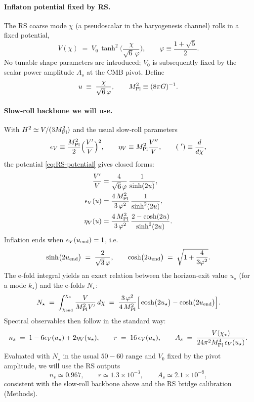 \documentclass[11pt]{article}
\begin{document}
\paragraph{Inflaton potential fixed by RS.}
The RS coarse mode \(\chi\) (a pseudoscalar in the baryogenesis channel) rolls in a fixed potential,
\begin{equation}
  V(\chi) \;=\; V_0\, \tanh^2\!\Big(\frac{\chi}{\sqrt{6}\,\varphi}\Big),
  \qquad
  \varphi \equiv \frac{1+\sqrt{5}}{2}.
  \label{eq:RS-potential}
\end{equation}
No tunable shape parameters are introduced; \(V_0\) is subsequently fixed by the scalar power amplitude \(A_s\) at the CMB pivot. Define
\[
  u \;\equiv\; \frac{\chi}{\sqrt{6}\,\varphi},
  \qquad
  M_{\rm Pl}^2 \equiv (8\pi G)^{-1}.
\]

\paragraph{Slow‑roll backbone we will use.}
With \(H^2 \simeq V/(3M_{\rm Pl}^2)\) and the usual slow‑roll parameters
\[
  \epsilon_V \equiv \frac{M_{\rm Pl}^2}{2}\Big(\frac{V'}{V}\Big)^2,
  \qquad
  \eta_V \equiv M_{\rm Pl}^2 \frac{V''}{V},
  \qquad(\ ') \equiv \frac{d}{d\chi},
\]
the potential \eqref{eq:RS-potential} gives closed forms:
\begin{align}
  \frac{V'}{V} &= \frac{4}{\sqrt{6}\,\varphi}\,\frac{1}{\sinh(2u)}, \\
  \epsilon_V(u) &= \frac{4\,M_{\rm Pl}^2}{3\,\varphi^2}\,\frac{1}{\sinh^2(2u)}, \\
  \eta_V(u) &= \frac{4\,M_{\rm Pl}^2}{3\,\varphi^2}\,\frac{2-\cosh(2u)}{\sinh^2(2u)}.
\end{align}
Inflation ends when \(\epsilon_V(u_{\rm end})=1\), i.e.
\[
  \sinh\!\big(2u_{\rm end}\big) \;=\; \frac{2}{\sqrt{3}\,\varphi},
  \qquad
  \cosh\!\big(2u_{\rm end}\big) \;=\; \sqrt{1+\frac{4}{3\varphi^2}}.
\]
The e‑fold integral yields an exact relation between the horizon‑exit value \(u_\star\) (for a mode \(k_\star\)) and the e‑folds \(N_\star\):
\begin{equation}
  N_\star \;=\; \int_{\chi_{\rm end}}^{\chi_\star}\frac{V}{M_{\rm Pl}^2 V'}\,d\chi
  \;=\; \frac{3\,\varphi^2}{4\,M_{\rm Pl}^2}\Big[\cosh\!\big(2u_\star\big)-\cosh\!\big(2u_{\rm end}\big)\Big].
  \label{eq:Nstar}
\end{equation}
Spectral observables then follow in the standard way:
\begin{equation}
  n_s \;=\; 1 - 6\epsilon_V(u_\star) + 2\eta_V(u_\star),
  \qquad
  r \;=\; 16\,\epsilon_V(u_\star),
  \qquad
  A_s \;=\; \frac{V(\chi_\star)}{24\pi^2 M_{\rm Pl}^4\,\epsilon_V(u_\star)}.
\end{equation}
Evaluated with \(N_\star\) in the usual \(50\!-\!60\) range and \(V_0\) fixed by the pivot amplitude, we will use the RS outputs
\[
  n_s \simeq 0.967,\qquad r \simeq 1.3\times 10^{-3},\qquad A_s \simeq 2.1\times 10^{-9},
\]
consistent with the slow‑roll backbone above and the RS bridge calibration (Methods).
\end{document}
